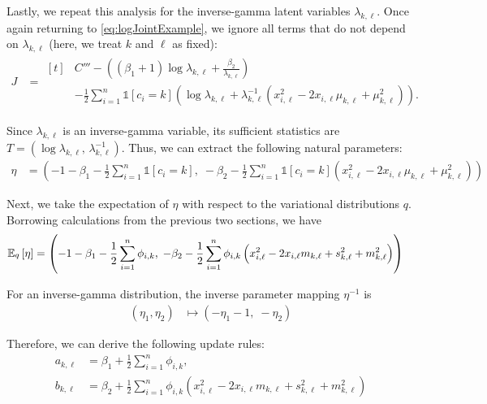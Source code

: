 \documentclass[11pt]{article}
\begin{document}
Lastly, we repeat this analysis for the inverse-gamma latent variables $\lambda_{k,\ell}$.
Once again returning to \eqref{eq:logJointExample}, we ignore all terms that do not depend on $\lambda_{k,\ell}$ (here, we treat $k$ and $\ell$ as fixed):
\begin{align}
J
&= \begin{aligned}[t]
    & C''' - \left((\beta_1 + 1) \log \lambda_{k,\ell} + \frac{\beta_2}{\lambda_{k,\ell}} \right) \\
    & - \frac{1}{2} \sum_{i=1}^n \mathds{1}[c_i = k]
        \left( \log \lambda_{k,\ell} + \lambda_{k,\ell}^{-1} \left( x_{i,\ell}^2 - 2 x_{i,\ell} \mu_{k,\ell} + \mu_{k,\ell}^2 \right) \right).
    \end{aligned}
\end{align}

Since $\lambda_{k,\ell}$ is an inverse-gamma variable, its sufficient statistics are $T = (\log \lambda_{k,\ell}, \, \lambda_{k,\ell}^{-1})$.
Thus, we can extract the following natural parameters:
\begin{align}
\eta
&=
\left(
    -1 - \beta_1 - \frac{1}{2} \sum_{i=1}^n \mathds{1}[c_i=k], \;
    -\beta_2 - \frac{1}{2} \sum_{i=1}^n \mathds{1}[c_i=k] \left( x_{i,\ell}^2 - 2 x_{i,\ell} \mu_{k,\ell} + \mu_{k,\ell}^2 \right)
\right)
\end{align}

Next, we take the expectation of $\eta$ with respect to the variational distributions $q$.
Borrowing calculations from the previous two sections, we have
\begin{align}
\mathbb{E}_{\substack{q}}\left[ \eta \right]
&=
\left(
    -1 - \beta_1 - \frac{1}{2} \sum_{i=1}^n \phi_{i,k}, \;
    -\beta_2 - \frac{1}{2} \sum_{i=1}^n \phi_{i,k}
        \left( x_{i,\ell}^2 - 2 x_{i,\ell} m_{k,\ell} + s_{k,\ell}^2 + m_{k,\ell}^2 \right)
\right)
\end{align}

For an inverse-gamma distribution, the inverse parameter mapping $\eta^{-1}$ is
\begin{align}
(\eta_1, \eta_2)
&\mapsto
\left(
    -\eta_1 - 1, \;
    -\eta_2
\right)
\end{align}

Therefore, we can derive the following update rules:
\begin{align}
\label{eq:exVarUpdateA}
a_{k,\ell}
&= \beta_1 + \frac{1}{2} \sum_{i=1}^n \phi_{i,k}, \\
\label{eq:exVarUpdateB}
b_{k,\ell}
&= \beta_2 + \frac{1}{2} \sum_{i=1}^n \phi_{i,k}
    \left( x_{i,\ell}^2 - 2 x_{i,\ell} m_{k,\ell} + s_{k,\ell}^2 + m_{k,\ell}^2 \right)
\end{align}
\end{document}
